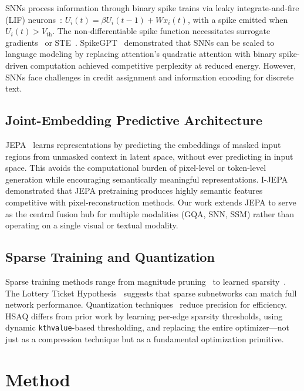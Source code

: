 \documentclass[conference]{IEEEtran}
\newcommand{\hsaq}{\textsc{HSAQ}}
\begin{document}
SNNs process information through binary spike trains via leaky integrate-and-fire (LIF) neurons~\cite{maass1997networks}: $U_i(t) = \beta U_i(t-1) + Wx_i(t)$, with a spike emitted when $U_i(t) > V_{\text{th}}$. The non-differentiable spike function necessitates surrogate gradients~\cite{neftci2019surrogate} or STE~\cite{bengio2013estimating}. SpikeGPT~\cite{zhu2023spikegpt} demonstrated that SNNs can be scaled to language modeling by replacing attention's quadratic attention with binary spike-driven computation achieved competitive perplexity at reduced energy. However, SNNs face challenges in credit assignment and information encoding for discrete text.

\subsection{Joint-Embedding Predictive Architecture}

JEPA~\cite{lecun2022path} learns representations by predicting the embeddings of masked input regions from unmasked context in latent space, without ever predicting in input space. This avoids the computational burden of pixel-level or token-level generation while encouraging semantically meaningful representations. I-JEPA~\cite{assran2023self} demonstrated that JEPA pretraining produces highly semantic features competitive with pixel-reconstruction methods. Our work extends JEPA to serve as the central fusion hub for multiple modalities (GQA, SNN, SSM) rather than operating on a single visual or textual modality.

\subsection{Sparse Training and Quantization}

Sparse training methods range from magnitude pruning~\cite{han2015learning} to learned sparsity~\cite{louizos2018learning}. The Lottery Ticket Hypothesis~\cite{frankle2018lottery} suggests that sparse subnetworks can match full network performance. Quantization techniques~\cite{jacob2018quantization} reduce precision for efficiency. \hsaq{} differs from prior work by learning per-edge sparsity thresholds, using dynamic \texttt{kthvalue}-based thresholding, and replacing the entire optimizer---not just as a compression technique but as a fundamental optimization primitive.

\section{Method}
\end{document}
